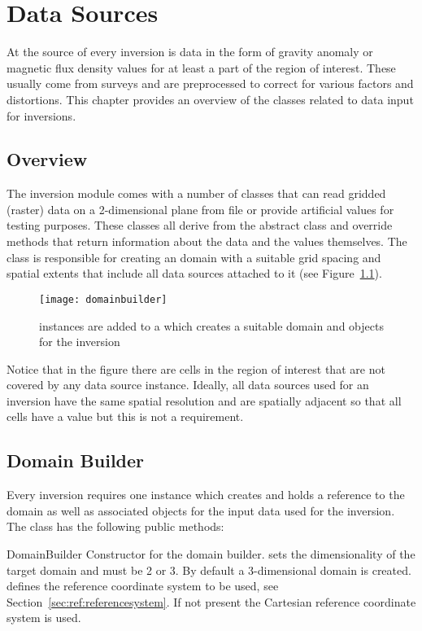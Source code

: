 \chapter{Data Sources}\label{Chp:ref:data sources}

At the source of every inversion is data in the form of gravity anomaly or
magnetic flux density values for at least a part of the region of interest.
These usually come from surveys and are preprocessed to correct for various
factors and distortions.
This chapter provides an overview of the classes related to data input for
inversions.

\section{Overview}
The inversion module comes with a number of classes that can read gridded
(raster) data on a 2-dimensional plane from file or provide artificial values
for testing purposes. These classes all derive from the abstract
 class and override methods that return information about
the data and the values themselves.
The  class is responsible for creating an \escript domain
with a suitable grid spacing and spatial extents that include all data sources
attached to it (see Figure~\ref{fig:domainBuilder}).
%
\begin{figure}[ht]
    \centering\texttt{[image: domainbuilder]}
    \caption{ instances are added to a 
        which creates a suitable domain and \Data objects for the inversion}
    \label{fig:domainBuilder}
\end{figure}
%
Notice that in the figure there are cells in the region of interest that are
not covered by any data source instance.
Ideally, all data sources used for an inversion have the same spatial resolution
and are spatially adjacent so that all cells have a value but this is not a
requirement.


\section{Domain Builder}\label{Chp:ref:domain builder}
Every inversion requires one  instance which creates and
holds a reference to the \escript domain as well as associated \Data objects for
the input data used for the inversion.
The class has the following public methods:

\begin{classdesc}{DomainBuilder}{}
Constructor for the domain builder.  sets the dimensionality of the
target domain and must be 2 or 3. By default a 3-dimensional domain is created.
 defines the reference coordinate system to be used, see Section~\ref{sec:ref:referencesystem}.
If not present the Cartesian reference coordinate system is used.
\end{classdesc}

